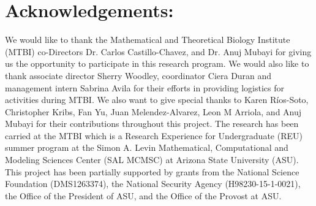 \documentclass[size=custom,width=48 in,height=42 in, landscape]{sciposter}
\begin{document}
\section{Acknowledgements:}

\small{
We would like to thank the Mathematical and Theoretical Biology Institute (MTBI) co-Directors Dr. Carlos Castillo-Chavez, and Dr. Anuj Mubayi for giving us the opportunity to participate in this research program. We would also like to thank associate director Sherry Woodley, coordinator Ciera Duran and management intern Sabrina Avila for their efforts in providing logistics for activities during MTBI. We also want to give special thanks to Karen Ríos-Soto, Christopher Kribs, Fan Yu, Juan Melendez-Alvarez, Leon M Arriola, and Anuj Mubayi for their contributions throughout this project. The research has been carried at the MTBI which is a Research Experience for Undergraduate (REU) summer program at the Simon A. Levin Mathematical, Computational and Modeling Sciences Center (SAL MCMSC) at Arizona State University (ASU). This project has been partially supported by grants from the National Science Foundation (DMS1263374), the National Security Agency (H98230-15-1-0021), the Office of the President of ASU, and the Office of the Provost at ASU.
}
\end{document}
